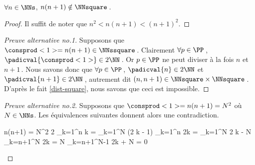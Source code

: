 \begin{fact} \label{case-1}
	 $\forall n \in \NNs$, $n(n+1) \notin \NNsquare$\,.
\end{fact}




\begin{proof}
	Il suffit de noter que $n^2 < n(n+1) < (n+1)^2$.
\end{proof}




\begin{proof}[Preuve alternative no.1]
    Supposons que $\consprod<1> = n(n+1) \in \NNssquare$\,.
    Clairement $\forall p \in \PP$\,, $\padicval{\consprod<1>} \in 2 \NN$\,.
    Or $p \in \PP$ ne peut diviser à la fois $n$ et $n+1$\,.
    Nous savons donc que $\forall p \in \PP$\,, 
    $\padicval{n} \in 2 \NN$ et $\padicval{n+1} \in 2 \NN$\,,
    autrement dit 
    $(n, n + 1) \in \NNsquare \times \NNsquare$\,.
    D'après le fait \ref{dist-square}, nous savons que ceci est impossible.
\end{proof}




\begin{proof}[Preuve alternative no.2]
     Supposons que $\consprod<1> = n(n+1) = N^2$ où $N \in \NNs$.
     Les équivalences suivantes donnent alors une contradiction.
	
	\medskip
	
	\begin{stepcalc}[style = ar*, ope = \iff]
		n(n+1) = N^2
		2 \dsum_{k=1}^{n} k = \dsum_{k=1}^{N} (2 k - 1)
	\explnext{}
		\dsum_{k=1}^{n} 2k = \dsum_{k=1}^{N} 2 k - N
		\dsum_{k=n+1}^{N} 2k = N
		\dsum_{k=n+1}^{N-1} 2k + N = 0
	\end{stepcalc}

	\vspace{-2ex}	
	\leavevmode
\end{proof}
